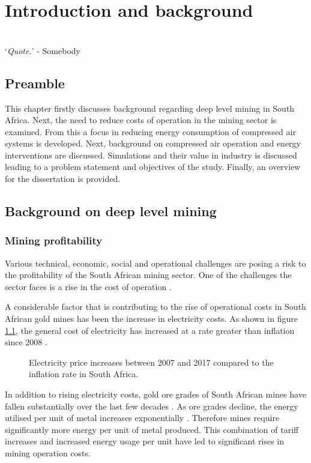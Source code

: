 \chapter{Introduction and background}  %
\thispagestyle{empty}
\vspace{38em}
\hrulefill
\\
\enquote*{\textit{Quote.}} - Somebody\\
\newpage

\section{Preamble}
This chapter firstly discusses background regarding deep level mining in South Africa. Next, the need to reduce costs of operation in the mining sector is examined. From this a focus in reducing energy consumption of compressed air systems is developed. Next, background on compressed air operation and energy interventions are discussed. Simulations and their value in industry is discussed leading to a problem statement and objectives of the study. Finally, an overview for the dissertation is provided.
\section{Background on deep level mining}
	\subsection{Mining profitability}
	 	Various technical, economic, social and operational challenges are posing a risk to the profitability of the South African mining sector. One of the challenges the sector faces  is a rise in the cost of operation \cite{neingo2016trends}.
	 	\par
		A considerable factor that is contributing to the rise of operational costs in South African gold mines has been the increase in electricity costs. As shown in figure \ref{fig: Eskom tariffs}, the general cost of electricity has increased at a rate greater than inflation since 2008 \cite{Eskom2013Tariffs}.
		\begin{figure}[h]
			\centering
			\fbox{}
			\caption[Electricity price increases between 2007 and 2017 compared to the inflation rate in South Africa..]{Electricity price increases between 2007 and 2017 \cite{Eskom2013Tariffs} compared to the inflation rate in South Africa.\protect\footnotemark[1] }
			\label{fig: Eskom tariffs}
		\end{figure}
		\par
		In addition to rising electricity costs, gold ore grades of South African mines have fallen substantially over the last few decades \cite{mudd2007global}. As ore grades decline, the energy utilised per unit of metal increases exponentially \cite{muller2010numerical}. Therefore mines require significantly more energy per unit of metal produced. This combination of tariff increases and increased energy usage per unit have led to significant rises in mining operation costs.
